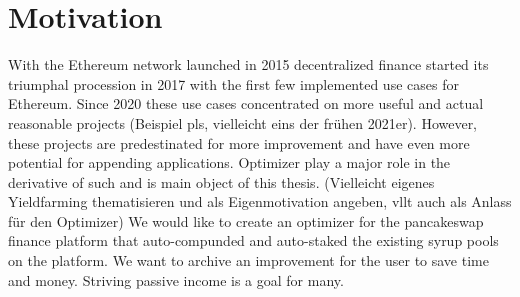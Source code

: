 \section{Motivation}
With the Ethereum network launched in 2015 decentralized finance started its triumphal procession in 2017 with the first few implemented use cases for Ethereum. Since 2020 these use cases concentrated on more useful and actual reasonable projects (Beispiel pls, vielleicht eins der frühen 2021er). However, these projects are predestinated for more improvement and have even more potential for appending applications. Optimizer play a major role in the derivative of such and is main object of this thesis. 
(Vielleicht eigenes Yieldfarming thematisieren und als Eigenmotivation angeben, vllt auch als Anlass für den Optimizer) We would like to create an optimizer for the pancakeswap finance platform that auto-compunded and auto-staked the existing syrup pools on the platform. We want to archive an improvement for the user to save time and money. Striving passive income is a goal for many.


